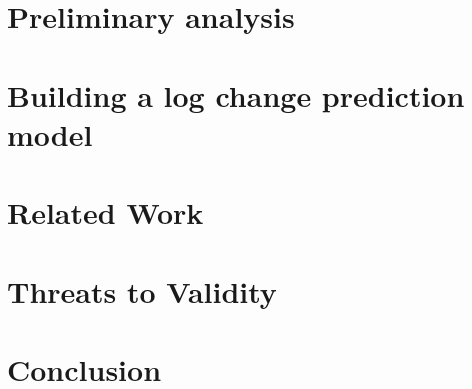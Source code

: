 %

\section{Preliminary analysis}

\label{analysis}



\section{Building a log change prediction model}
%
\label{prediction}




\section{Related Work}
\label{related}


\section{Threats to Validity}
\label{threats}


\section{Conclusion}
\label{conc}










